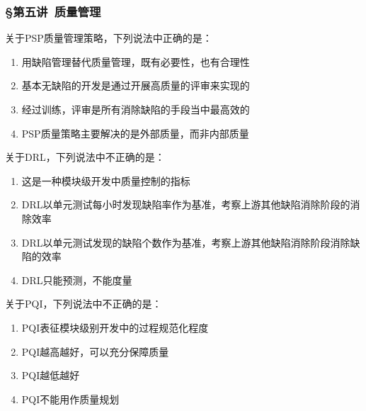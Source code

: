 \subsubsection*{\S 第五讲\ 质量管理}
\setcounter{problemname}{0}

\begin{problem}
	关于PSP质量管理策略，下列说法中正确的是：
        \begin{enumerate}[label=\Alph*.]
            \item 用缺陷管理替代质量管理，既有必要性，也有合理性
            \item 基本无缺陷的开发是通过开展高质量的评审来实现的
            \item 经过训练，评审是所有消除缺陷的手段当中最高效的
            \item PSP质量策略主要解决的是外部质量，而非内部质量
        \end{enumerate}
\end{problem}



\begin{problem}
	关于DRL，下列说法中不正确的是：
        \begin{enumerate}[label=\Alph*.]
            \item 这是一种模块级开发中质量控制的指标
            \item DRL以单元测试每小时发现缺陷率作为基准，考察上游其他缺陷消除阶段的消除效率
            \item DRL以单元测试发现的缺陷个数作为基准，考察上游其他缺陷消除阶段消除缺陷的效率
            \item DRL只能预测，不能度量
        \end{enumerate}
\end{problem}



\begin{problem}
	关于PQI，下列说法中不正确的是：
    \vspace{-0.8em}
    \begin{multicols}{2}
        \begin{enumerate}[label=\Alph*.]
            \item PQI表征模块级别开发中的过程规范化程度
            \item PQI越高越好，可以充分保障质量
            \item PQI越低越好
            \item PQI不能用作质量规划
        \end{enumerate}
    \end{multicols}
    \vspace{-1em}
\end{problem}



